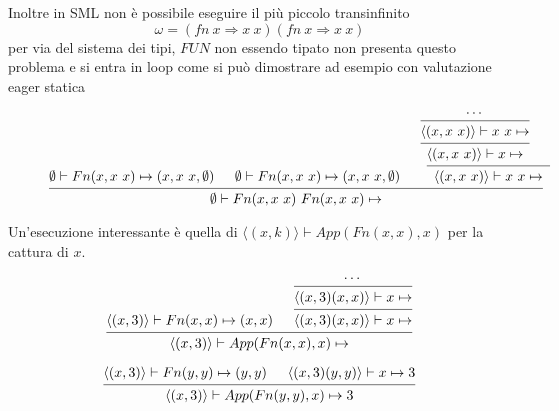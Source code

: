 \documentclass[a4paper]{article}
\begin{document}
	Inoltre in SML non è possibile eseguire il più piccolo transinfinito 
	\[ \omega = (fn \ x \Rightarrow x \ x)(fn \ x \Rightarrow x \ x) \]
	per via del sistema dei tipi, $FUN$ non essendo tipato non presenta questo problema e si entra in loop come si può dimostrare ad esempio con valutazione eager statica
	
	\begin{figure}[ht]
	\[
		\begin{prooftree}
			\hypo{\emptyset \vdash Fn(x, x \ x) \mapsto (x, x \ x, \emptyset)}

			\hypo{\emptyset \vdash Fn(x, x \ x) \mapsto (x, x \ x, \emptyset)}

			\hypo{\cdots}
			\infer1[]{\langle (x, x \ x) \rangle \vdash x \ x \mapsto}
			\infer1[]{\langle (x, x \ x) \rangle \vdash x \mapsto}
			\hypo{}
			\infer2[]{\langle (x, x \ x) \rangle \vdash x \ x \mapsto }

			\infer3[]{\emptyset \vdash Fn(x, x \ x)\ Fn(x, x \ x) \mapsto }

		\end{prooftree}
	\]
	\end{figure}
	
	Un'esecuzione interessante è quella di $\langle (x, k) \rangle \vdash App(Fn(x,x),x)$ per la cattura di $x$. 

	\begin{figure}[H]
	\[
		\begin{prooftree}
			\hypo{\langle (x,3) \rangle \vdash Fn(x,x) \mapsto (x,x)}
			\hypo{\cdots}
			\infer1[]{\langle (x,3)(x,x) \rangle \vdash x \mapsto }
			\infer1[]{\langle (x,3)(x,x) \rangle \vdash x \mapsto }
			\infer2[]{\langle (x,3) \rangle \vdash App(Fn(x,x),x) \mapsto }
		\end{prooftree}
	\]
	\end{figure}


	\begin{figure}[H]
	\[
		\begin{prooftree}
			\hypo{\langle (x,3) \rangle \vdash Fn(y,y) \mapsto (y,y)}
			\hypo{\langle (x,3)(y,y) \rangle \vdash x \mapsto 3}
			\infer2[]{\langle (x,3) \rangle \vdash App(Fn(y,y),x) \mapsto 3}
		\end{prooftree}
	\]
	\end{figure}
\end{document}
